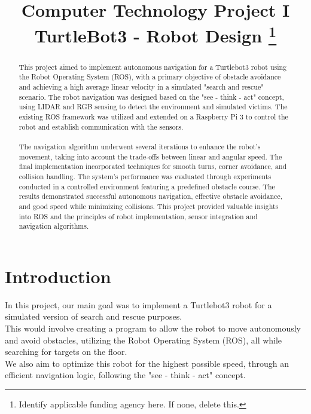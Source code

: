 \documentclass[conference]{IEEEtran}
\begin{document}
\title{Computer Technology Project I\\
{\large TurtleBot3 - Robot Design}
\thanks{Identify applicable funding agency here. If none, delete this.}
}

\author{
\and
{}
}

\maketitle

\begin{abstract}
This project aimed to implement autonomous navigation for a Turtlebot3 robot using the Robot Operating System (ROS), 
with a primary objective of obstacle avoidance and achieving a high average linear velocity in a simulated "search and rescue" 
scenario. The robot navigation was designed based on the "see - think - act" concept, using LIDAR and RGB sensing to 
detect the environment and simulated victims. The existing ROS framework was utilized and extended on a Raspberry Pi 3 
to control the robot and establish communication with the sensors. \\\\
The navigation algorithm underwent several iterations to enhance the robot's movement, taking into account the 
trade-offs between linear and angular speed. The final implementation incorporated techniques for smooth turns, 
corner avoidance, and collision handling. The system's performance was evaluated through experiments conducted in a 
controlled environment featuring a predefined obstacle course.
The results demonstrated successful autonomous navigation, effective obstacle avoidance, and good speed while minimizing 
collisions. This project provided valuable insights into ROS and the principles of robot implementation, sensor integration 
and navigation algorithms.
\end{abstract}

\section{Introduction}\label{intro}
In this project, our main goal was to implement a Turtlebot3 robot for a simulated version of search and rescue purposes.\\
This would involve creating a program to allow the robot to move autonomously and avoid obstacles, utilizing the 
Robot Operating System (ROS), all while searching for targets on the floor.\\
We also aim to optimize this robot for the highest possible speed, through an efficient navigation logic, 
following the "see - think - act" concept.\\
\end{document}
